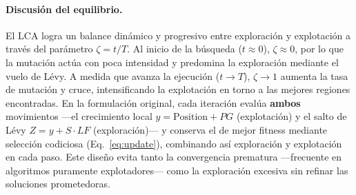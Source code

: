 \paragraph{Discusión del equilibrio.}
El LCA logra un balance dinámico y progresivo entre exploración y explotación a través
del parámetro $\zeta = t/T$. Al inicio de la búsqueda ($t \approx 0$), $\zeta \approx 0$,
por lo que la mutación actúa con poca intensidad y predomina la exploración mediante el
vuelo de Lévy. A medida que avanza la ejecución ($t \to T$), $\zeta \to 1$ aumenta la
tasa de mutación y cruce, intensificando la explotación en torno a las mejores regiones
encontradas. En la formulación original, cada iteración evalúa \textbf{ambos} movimientos
---el crecimiento local $y = \text{Position}+PG$ (explotación) y el salto de Lévy
$Z = y + S\cdot LF$ (exploración)--- y conserva el de mejor fitness mediante selección
codiciosa (Eq.~\ref{eq:update}), combinando así exploración y explotación en cada paso.
Este diseño evita tanto la convergencia prematura —frecuente en algoritmos puramente
explotadores— como la exploración excesiva sin refinar las soluciones prometedoras.
